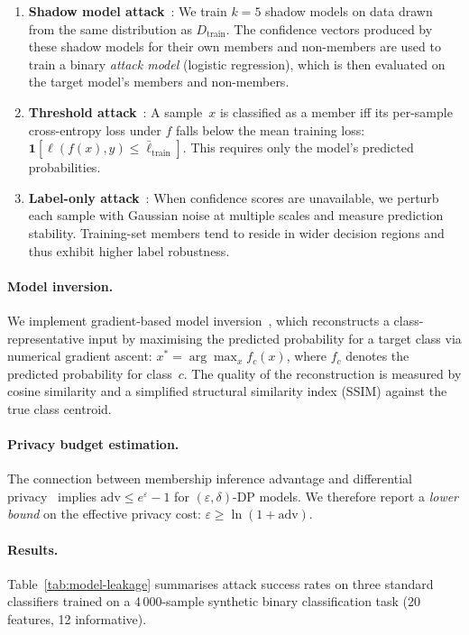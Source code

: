 \documentclass[11pt]{article}
\begin{document}
\begin{enumerate}
\item \textbf{Shadow model attack}~\cite{shokri2017}: We train
  $k=5$ shadow models on data drawn from the same distribution as
  $D_{\mathrm{train}}$.  The confidence vectors produced by these
  shadow models for their own members and non-members are used to
  train a binary \emph{attack model} (logistic regression), which is
  then evaluated on the target model's members and non-members.

\item \textbf{Threshold attack}~\cite{yeom2018}: A sample~$x$ is
  classified as a member iff its per-sample cross-entropy loss under
  $f$ falls below the mean training loss:
  $\mathbf{1}[\ell(f(x), y) \le \bar{\ell}_{\mathrm{train}}]$.
  This requires only the model's predicted probabilities.

\item \textbf{Label-only attack}~\cite{choquette2021}: When
  confidence scores are unavailable, we perturb each sample with
  Gaussian noise at multiple scales and measure prediction stability.
  Training-set members tend to reside in wider decision regions and
  thus exhibit higher label robustness.
\end{enumerate}

\paragraph{Model inversion.}
We implement gradient-based model inversion~\cite{fredrikson2015},
which reconstructs a class-representative input by maximising the
predicted probability for a target class via numerical gradient
ascent:
$x^* = \arg\max_{x} f_c(x)$, where $f_c$ denotes the predicted
probability for class~$c$.
The quality of the reconstruction is measured by cosine similarity
and a simplified structural similarity index (SSIM) against the
true class centroid.

\paragraph{Privacy budget estimation.}
The connection between membership inference advantage and differential
privacy~\cite{yeom2018} implies $\mathrm{adv} \le e^{\varepsilon}-1$
for $(\varepsilon,\delta)$-DP models.  We therefore report a
\emph{lower bound} on the effective privacy cost:
$\varepsilon \ge \ln(1 + \mathrm{adv})$.

\paragraph{Results.}
Table~\ref{tab:model-leakage} summarises attack success rates on three
standard classifiers trained on a 4\,000-sample synthetic
binary classification task (20 features, 12 informative).
\end{document}
